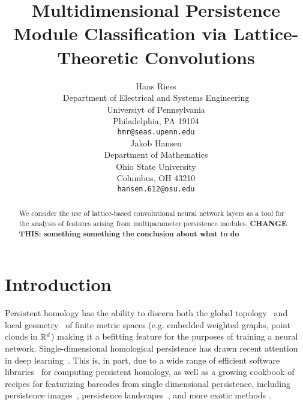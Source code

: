 \documentclass{article}
\title{Multidimensional Persistence Module Classification via Lattice-Theoretic Convolutions}
\author{%
  Hans Riess  \\
  Department of Electrical and Systems Engineering \\
  Universiyt of Pennsylvania\\
  Philadelphia, PA 19104 \\
  \texttt{hmr@seas.upenn.edu} \\
  \And
  Jakob Hansen \\
  Department of Mathematics \\
  Ohio State University \\
  Columbus, OH 43210 \\
  \texttt{hansen.612@osu.edu}
}
\begin{document}
\maketitle

\begin{abstract}
 We consider the use of lattice-based convolutional neural network layers as a 
 tool for the analysis of features arising from multiparameter persistence
 modules. \textbf{CHANGE THIS: something something the conclusion about what to do}
\end{abstract}

\section{Introduction}

Persistent homology has the ability to discern both the global
topology~\cite{ghrist_barcodes:_2008} and local
geometry~\cite{bubenik_persistent_2020} of finite metric spaces (e.g. embedded
weighted graphs, point clouds in $\mathbb{R}^d$) making it a befitting feature for the
purposes of training a neural network. Single-dimensional homological
persistence has drawn recent attention in deep learning~\cite{hofer_deep_2017,
pun_persistent-homology-based_2018, bruel-gabrielsson_topology_2020}. This is,
in part, due to a wide range of efficient software
libraries~\cite{otter_roadmap_2017, henselman_matroid_2017, bauer_ripser:_2019}
for computing persistent homology, %
as well as a growing cookbook of recipes 
for featurizing barcodes from single dimensional persistence, including
persistence images~\cite{adams_persistence_2017}, persistence
landscapes~\cite{bubenik_statistical_2015}, and more exotic methods
\cite{kalisnik_tropical_2019}.
\end{document}
